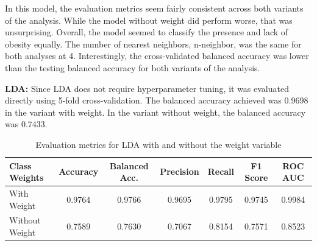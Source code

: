 \documentclass[a4paper,12pt]{article}
\begin{document}
In this model, the evaluation metrics seem fairly consistent across both variants of the analysis. While the model without weight did perform worse, that was unsurprising. Overall, the model seemed to classify the presence and lack of obesity equally. The number of nearest neighbors, n-neighbor, was the same for both analyses at 4. Interestingly, the cross-validated balanced accuracy was lower than the testing balanced accuracy for both variants of the analysis.

\textbf{LDA:}
Since LDA does not require hyperparameter tuning, it was evaluated directly using 5-fold cross-validation. The balanced accuracy achieved was 0.9698 in the variant with weight. In the variant without weight, the balanced accuracy was 0.7433.


\begin{table}[H]
\centering
\small
\begin{tabular}{lcccccc}
\toprule
\textbf{Class Weights} & \textbf{Accuracy} & \textbf{Balanced Acc.} & \textbf{Precision} & \textbf{Recall} & \textbf{F1 Score} & \textbf{ROC AUC} \\
\midrule
With Weight & 0.9764 & 0.9766 & 0.9695 & 0.9795 & 0.9745 & 0.9984 \\
Without Weight & 0.7589 & 0.7630 & 0.7067 & 0.8154 & 0.7571 & 0.8523 \\
\bottomrule
\end{tabular}
\caption{Evaluation metrics for LDA with and without the weight variable}
\label{tab:lda_weights}
\end{table}
\end{document}
